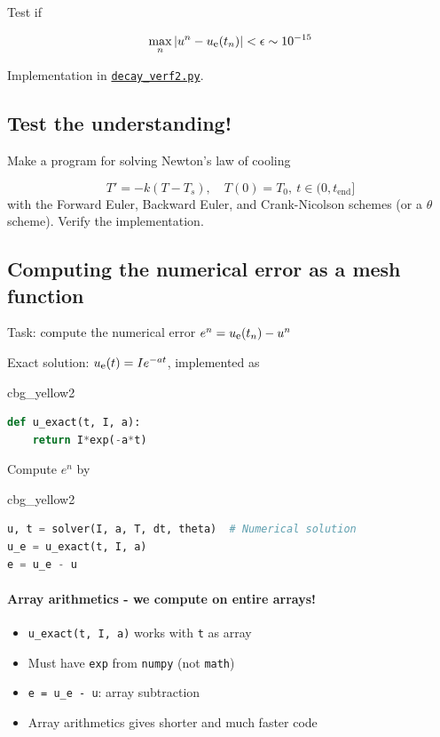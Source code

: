 \documentclass[%
oneside,                 %
final,                   %
10pt]{article}
\newenvironment{_cod_tight}[1]{
   \def\FrameCommand{\colorbox{#1}}
   \FrameRule0.6pt\MakeFramed {\FrameRestore}\vskip3mm}
   {\vskip0mm\endMakeFramed}
\newenvironment{cod}[1]{
\bgroup\rmfamily
\fboxsep=0mm\relax
\begin{_cod_tight}{#1}
\list{}{\parsep=-2mm\parskip=0mm\topsep=0pt\leftmargin=2mm
\rightmargin=2\leftmargin\leftmargin=4pt\relax}
\item\relax}
{\endlist\end{_cod_tight}\egroup}
\begin{document}
Test if

\[ \max_n |u^n - \uex(t_n)| < \epsilon\sim 10^{-15}\]

Implementation in \href{{http://tinyurl.com/ofkw6kc/alg/decay_verf2.py}}{\nolinkurl{decay_verf2.py}}.

\subsection*{Test the understanding!}

Make a program for solving Newton's law of cooling

\[ T' = -k(T-T_s),\quad T(0)=T_0,\ t\in (0,t_{\mbox{end}}]\]
with the Forward Euler, Backward Euler, and Crank-Nicolson schemes
(or a $\theta$ scheme). Verify the implementation.


\subsection*{Computing the numerical error as a mesh function}
\label{decay:computing:error}

Task: compute the numerical error $e^n = \uex(t_n) - u^n$

Exact solution: $\uex(t)=Ie^{-at}$, implemented as

\begin{cod}{cbg_yellow2}\begin{lstlisting}[language=Python,style=simple,xleftmargin=2mm]
def u_exact(t, I, a):
    return I*exp(-a*t)
\end{lstlisting}\end{cod}
\noindent

Compute $e^n$ by

\begin{cod}{cbg_yellow2}\begin{lstlisting}[language=Python,style=simple,xleftmargin=2mm]
u, t = solver(I, a, T, dt, theta)  # Numerical solution
u_e = u_exact(t, I, a)
e = u_e - u
\end{lstlisting}\end{cod}
\noindent


\paragraph{Array arithmetics - we compute on entire arrays!}

\begin{itemize}
 \item \Verb!u_exact(t, I, a)! works with \texttt{t} as array

 \item Must have \texttt{exp} from \texttt{numpy} (not \texttt{math})

 \item \Verb!e = u_e - u!: array subtraction

 \item Array arithmetics gives shorter and much faster code
\end{itemize}
\end{document}
